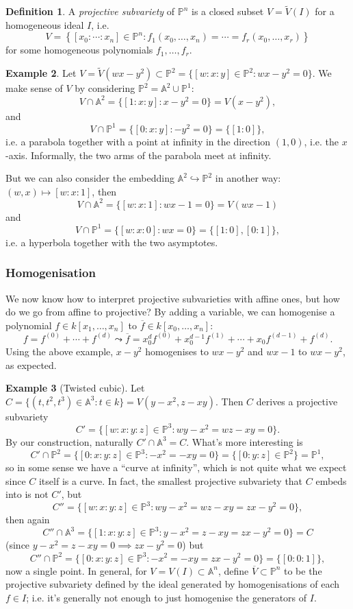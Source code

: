 \documentclass{article}
\newcommand{\A}{\mathbb{A}}
\newcommand{\p}{\mathbb{P}}
\theoremstyle{definition}
\newtheorem{defn}{Definition}[subsection]
\newtheorem{example}[defn]{Example}
\begin{document}
\begin{defn}
A \textit{projective subvariety} of $\p^n$ is a closed subset $V=\widetilde V(I)$ for a homogeneous ideal $I$, i.e.
\[
V=\left\{[x_0:\cdots:x_n]\in\p^n:f_1(x_0,\ldots,x_n)=\cdots=f_r(x_0,\ldots,x_r)\right\}
\]
for some homogeneous polynomials $f_1,\ldots,f_r$.
\end{defn}

\begin{example}
Let $V=\widetilde V(wx-y^2)\subset\p^2=\{[w:x:y]\in\p^2:wx-y^2=0\}$. We make sense of $V$ by considering $\p^2=\A^2\cup\p^1$:
\[
V\cap\A^2=\{[1:x:y]:x-y^2=0\}=V(x-y^2),
\]
and
\[
V\cap\p^1=\{[0:x:y]:-y^2=0\}=\{[1:0]\},
\]
i.e. a parabola together with a point at infinity in the direction $(1,0)$, i.e. the $x$-axis. Informally, the two arms of the parabola meet at infinity.

But we can also consider the embedding $\A^2\hookrightarrow\p^2$ in another way: $(w,x)\mapsto [w:x:1]$, then
\[
V\cap\A^2=\{[w:x:1]:wx-1=0\}=V(wx-1)
\]
and
\[
V\cap\p^1=\{[w:x:0]:wx=0\}=\{[1:0],[0:1]\},
\]
i.e. a hyperbola together with the two asymptotes.
\end{example}

\subsubsection{Homogenisation}
We now know how to interpret projective subvarieties with affine ones, but how do we go from affine to projective? By adding a variable, we can homogenise a polynomial $f\in k[x_1,\ldots,x_n]$ to $\overline f\in k[x_0,\ldots,x_n]$:
\[
f=f^{(0)}+\cdots+f^{(d)}\leadsto \overline f=x_0^df^{(0)}+x_0^{d-1}f^{(1)}+\cdots+x_0f^{(d-1)}+f^{(d)}.
\]
Using the above example, $x-y^2$ homogenises to $wx-y^2$ and $wx-1$ to $wx-y^2$, as expected.

\begin{example}[Twisted cubic]
Let $C=\{(t,t^2,t^3)\in\A^3:t\in k\}=V(y-x^2,z-xy)$. Then $C$ derives a projective subvariety
\[
C'=\{[w:x:y:z]\in\p^3:wy-x^2=wz-xy=0\}.
\]
By our construction, naturally $C'\cap\A^3=C$. What's more interesting is
\[
C'\cap\p^2=\{[0:x:y:z]\in\p^3:-x^2=-xy=0\}=\{[0:y:z]\in\p^2\}=\p^1,
\]
so in some sense we have a ``curve at infinity'', which is not quite what we expect since $C$ itself is a curve. In fact, the smallest projective subvariety that $C$ embeds into is not $C'$, but
\[
C''=\{[w:x:y:z]\in\p^3:wy-x^2=wz-xy=zx-y^2=0\},
\]
then again
\[
C''\cap\A^3=\{[1:x:y:z]\in\p^3:y-x^2=z-xy=zx-y^2=0\}=C
\]
(since $y-x^2=z-xy=0\implies zx-y^2=0$) but
\[
C''\cap\p^2=\{[0:x:y:z]\in\p^3:-x^2=-xy=zx-y^2=0\}=\{[0:0:1]\},
\]
now a single point. In general, for $V=V(I)\subset\A^n$, define $\overline V\subset\p^n$ to be the projective subvariety defined by the ideal generated by homogenisations of each $f\in I$; i.e. it's generally not enough to just homogenise the generators of $I$.
\end{example}
\end{document}
